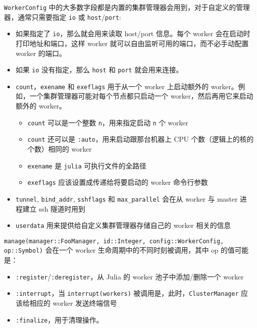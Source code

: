\texttt{WorkerConfig} 中的大多数字段都是内置的集群管理器会用到，对于自定义的管理器，通常只需要指定 \texttt{io} 或 \texttt{host}/\texttt{port}:



\begin{itemize}
\item 如果指定了 \texttt{io}，那么就会用来读取 host/port 信息。每个 worker 会在启动时打印地址和端口，这样 worker 就可以自由监听可用的端口，而不必手动配置 worker 的端口。


\item 如果 \texttt{io} 没有指定，那么 \texttt{host} 和 \texttt{port} 就会用来连接。


\item \texttt{count}，\texttt{exename} 和 \texttt{exeflags} 用于从一个 worker 上启动额外的 worker。例如，一个集群管理器可能对每个节点都只启动一个 worker，然后再用它来启动额外的 worker。

\begin{itemize}
\item \texttt{count} 可以是一个整数 \texttt{n}，用来指定启动 \texttt{n} 个 worker


\item \texttt{count} 还可以是 \texttt{:auto}，用来启动跟那台机器上 CPU 个数（逻辑上的核的个数）相同的 worker


\item \texttt{exename} 是 \texttt{julia} 可执行文件的全路径


\item \texttt{exeflags} 应该设置成传递给将要启动的 worker 命令行参数

\end{itemize}

\item \texttt{tunnel}, \texttt{bind\_addr}, \texttt{sshflags} 和 \texttt{max\_parallel} 会在从 worker 与 master 进程建立 ssh 隧道时用到


\item \texttt{userdata} 用来提供给自定义集群管理器存储自己的 worker 相关的信息

\end{itemize}


\texttt{manage(manager::FooManager, id::Integer, config::WorkerConfig, op::Symbol)} 会在一个 worker 生命周期中的不同时刻被调用，其中 op 的值可能是：



\begin{itemize}
\item \texttt{:register}/\texttt{:deregister}，从 Julia 的 worker 池子中添加/删除一个 worker


\item \texttt{:interrupt}，当 \texttt{interrupt(workers)} 被调用是，此时，\texttt{ClusterManager} 应该给相应的 worker 发送终端信号


\item \texttt{:finalize}，用于清理操作。

\end{itemize}


